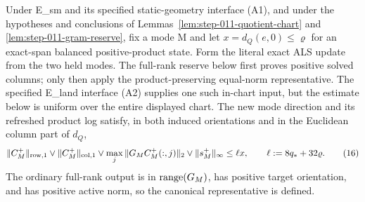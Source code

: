 \begin{proposition}\label{prop:step-011-block-contraction}
Under E\_sm and its specified static-geometry interface (A1), and under the hypotheses and conclusions of
Lemmas~\ref{lem:step-011-quotient-chart} and
\ref{lem:step-011-gram-reserve}, fix a mode M and let
\(x=d_Q(e,0)\le\varrho\) for an exact-span balanced positive-product state.
Form the literal exact ALS update from the two held modes. The full-rank
reserve below first proves positive solved columns; only then apply the
product-preserving equal-norm representative. The specified E\_land interface
(A2) supplies one such in-chart input, but the estimate below is uniform over
the entire displayed chart.
The new mode direction and its refreshed product log satisfy, in both
induced orientations and in the Euclidean column part of \(d_Q\),
\[
 \|C_M^+\|_{\rm row,1}\vee\|C_M^+\|_{\rm col,1}
 \vee\max_j\|G_MC_M^+(:,j)\|_2
 \vee\|s_M^+\|_\infty
 \le \ell x,
 \qquad \ell:=8q_*+32\varrho.
\tag{16}
\]
The ordinary full-rank output is in \({\rm range}(G_M)\), has positive
target orientation, and has positive active norm, so the canonical
representative is defined.


\end{proposition}
